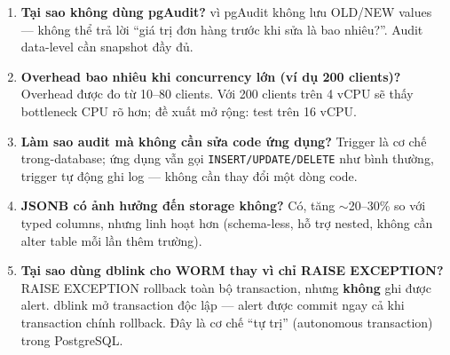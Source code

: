 \begin{sloppypar}
\begin{enumerate}
    \item \textbf{Tại sao không dùng pgAudit?} vì pgAudit không lưu OLD/NEW values --- không thể trả lời ``giá trị đơn hàng trước khi sửa là bao nhiêu?''. Audit data-level cần snapshot đầy đủ.

    \item \textbf{Overhead bao nhiêu khi concurrency lớn (ví dụ 200 clients)?} Overhead được đo từ 10--80 clients. Với 200 clients trên 4 vCPU sẽ thấy bottleneck CPU rõ hơn; đề xuất mở rộng: test trên 16 vCPU.

    \item \textbf{Làm sao audit mà không cần sửa code ứng dụng?} Trigger là cơ chế trong-database; ứng dụng vẫn gọi \texttt{INSERT/UPDATE/DELETE} như bình thường, trigger tự động ghi log --- không cần thay đổi một dòng code.

    \item \textbf{JSONB có ảnh hưởng đến storage không?} Có, tăng $\sim$20--30\% so với typed columns, nhưng linh hoạt hơn (schema-less, hỗ trợ nested, không cần alter table mỗi lần thêm trường).

    \item \textbf{Tại sao dùng dblink cho WORM thay vì chỉ RAISE EXCEPTION?} RAISE EXCEPTION rollback toàn bộ transaction, nhưng \textbf{không} ghi được alert. dblink mở transaction độc lập --- alert được commit ngay cả khi transaction chính rollback. Đây là cơ chế ``tự trị'' (autonomous transaction) trong PostgreSQL.
\end{enumerate}
\end{sloppypar}

